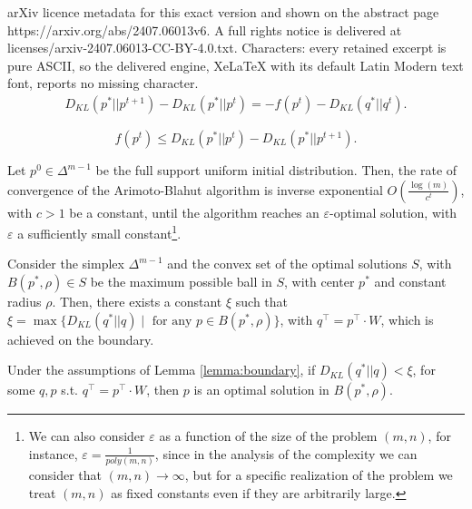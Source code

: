 \documentclass[10pt,a4paper]{amsart}
\begin{document}
arXiv licence metadata for this exact version and shown on the abstract page https://arxiv.org/abs/2407.06013v6. A full rights notice is delivered at licenses/arxiv-2407.06013-CC-BY-4.0.txt. Characters: every retained excerpt is pure ASCII, so the delivered engine, XeLaTeX with its default Latin Modern text font, reports no missing character.
\begin{equation}\label{Difference of KL- f}
\begin{split}
D_{KL}(p^*||p^{t+1}) - D_{KL}(p^*||p^{t}) = - f(p^t)- D_{KL}(q^*||q^t).
\end{split}
\end{equation}

\begin{equation}
\label{bound of f}
f(p^t) \leq D_{KL}(p^*||p^{t}) -D_{KL}(p^*||p^{t+1}).%
\end{equation}

\begin{theorem}\label{thm:rate of convergence}
Let $p^0 \in \Delta^{m-1}$ be the full support uniform initial distribution. Then, the rate of convergence of the Arimoto-Blahut algorithm is inverse exponential $O\left(\frac{\log(m)}{c^t} \right)$, with $c>1$ be a constant, until the algorithm reaches an $\varepsilon$-optimal solution, with $\varepsilon$ a sufficiently small constant\footnote{We can also consider $\varepsilon$ as a function of the size of the problem $(m,n)$, for instance, $\varepsilon=\frac{1}{poly(m,n)}$, since in the analysis of the complexity we can consider that $(m,n)\to \infty$, but for a specific realization of the problem we treat $(m,n)$ as fixed constants even if they are arbitrarily large.}. 
\end{theorem}

\begin{lemma}
\label{lemma:boundary}
Consider the simplex $\Delta^{m-1}$ and the convex set of the optimal solutions $S$, with $B(p^*, \rho) \in S$ be the maximum possible ball in $S$, with center $p^*$ and constant radius $\rho$. Then, there exists a constant $\xi$ such that $\xi = \max \{D_{KL}(q^*|| q) \mid \text{ for any }p \in B(p^*, \rho)\}$, with $q^{\top} = p^{\top}\cdot W$, which is achieved on the boundary.  
\end{lemma}

\begin{corollary}
\label{corollary 1}
Under the assumptions of Lemma \ref{lemma:boundary}, if $D_{KL}(q^*|| q)<\xi$, for some $q,p$ s.t. $q^{\top} = p^{\top} \cdot W$, then $p$ is an optimal solution in $B(p^*,\rho)$.
\end{corollary}
\end{document}

